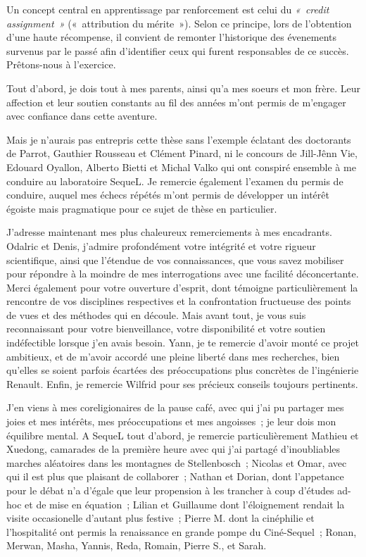 
\begin{acknowledgements}
Un concept central en apprentissage par renforcement est celui du \emph{«~credit assignment~»} («~attribution du mérite~»). Selon ce principe, lors de l'obtention d'une haute récompense, il convient de remonter l'historique des évenements survenus par le passé afin d'identifier ceux qui furent responsables de ce succès.
Prêtons-nous à l'exercice.

Tout d'abord, je dois tout à mes parents, ainsi qu'a mes soeurs et mon frère. Leur affection et leur soutien constants au fil des années m'ont permis de m'engager avec confiance dans cette aventure.

Mais je n'aurais pas entrepris cette thèse sans l'exemple éclatant des doctorants de Parrot, Gauthier Rousseau et Clément Pinard, ni le concours de Jill-Jênn Vie, Edouard Oyallon, Alberto Bietti et Michal Valko qui ont conspiré ensemble à me conduire au laboratoire SequeL. Je remercie également l'examen du permis de conduire, auquel mes échecs répétés m'ont permis de développer un intérêt égoiste mais pragmatique pour ce sujet de thèse en particulier.

J'adresse maintenant mes plus chaleureux remerciements à mes encadrants. Odalric et Denis, j'admire profondément votre intégrité et votre rigueur scientifique, ainsi que l'étendue de vos connaissances, que vous savez mobiliser pour répondre à la moindre de mes interrogations avec une facilité déconcertante. Merci également pour votre ouverture d'esprit, dont témoigne particulièrement la rencontre de vos disciplines respectives et la confrontation fructueuse des points de vues et des méthodes qui en découle. Mais avant tout, je vous suis reconnaissant pour votre bienveillance, votre disponibilité et votre soutien indéfectible lorsque j'en avais besoin.
Yann, je te remercie d'avoir monté ce projet ambitieux, et de m'avoir accordé une pleine liberté dans mes recherches, bien qu'elles se soient parfois écartées des préoccupations plus concrètes de l'ingénierie Renault. Enfin, je remercie Wilfrid pour ses précieux conseils toujours pertinents.

J'en viens à mes coreligionaires de la pause café, avec qui j'ai pu partager mes joies et mes intérêts, mes préoccupations et mes angoisses~; je leur dois mon équilibre mental. A SequeL tout d'abord, je remercie particulièrement Mathieu et Xuedong, camarades de la première heure avec qui j'ai partagé d'inoubliables marches aléatoires dans les montagnes de Stellenbosch~; Nicolas et Omar, avec qui il est plus que plaisant de collaborer~; 
Nathan et Dorian, dont l'appetance pour le débat n'a d'égale que leur propension à les trancher à coup d'études ad-hoc et de mise en équation~;  Lilian et Guillaume dont l'éloignement rendait la visite occasionelle d'autant plus festive~; Pierre M. dont la cinéphilie et l'hospitalité ont permis la renaissance en grande pompe du Ciné-Sequel~; Ronan, Merwan, Masha, Yannis, Reda, Romain, Pierre S., et Sarah. 


\end{acknowledgements}

